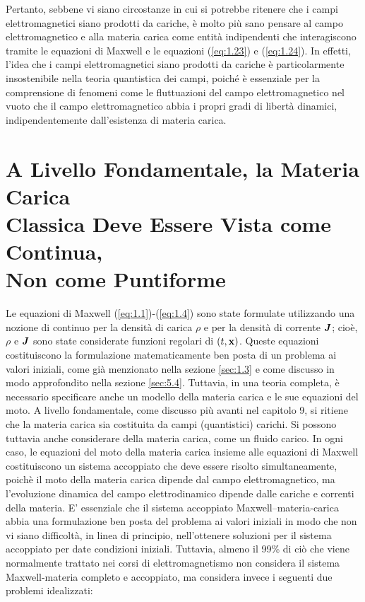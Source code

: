 Pertanto, sebbene vi siano circostanze in cui si potrebbe ritenere che i campi elettromagnetici siano prodotti da cariche, è molto più sano pensare al campo elettromagnetico e alla materia carica come entità indipendenti che interagiscono tramite le equazioni di Maxwell e le equazioni (\ref{eq:1.23}) e (\ref{eq:1.24}). In effetti, l'idea che i campi elettromagnetici siano prodotti da cariche è particolarmente insostenibile nella teoria quantistica dei campi, poiché è essenziale per la comprensione di fenomeni come le fluttuazioni del campo elettromagnetico nel vuoto che il campo elettromagnetico abbia i propri gradi di libertà dinamici, indipendentemente dall'esistenza di materia carica.

\section[Materia Carica come un Continuo]{A Livello Fondamentale, la Materia Carica \\Classica Deve Essere Vista come Continua, \\Non come Puntiforme}\label{sec:1.4}

Le equazioni di Maxwell (\ref{eq:1.1})-(\ref{eq:1.4}) sono state formulate utilizzando una nozione di continuo per la densità di carica $\rho$ e per la densità di corrente $\vb*{J}$; cioè, $\rho$ e  $\vb*{J}$ sono state considerate funzioni regolari di $(t, \vb{x})$. Queste equazioni costituiscono la formulazione matematicamente ben posta di un problema ai valori iniziali, come già menzionato nella sezione \ref{sec:1.3} e come discusso in modo approfondito nella sezione \ref{sec:5.4}. Tuttavia, in una teoria completa, è necessario specificare anche un modello della materia carica e le sue equazioni del moto. A livello fondamentale, come discusso più avanti nel capitolo 9, si ritiene che la materia carica sia costituita da campi (quantistici) carichi.  Si possono tuttavia anche considerare  della materia carica, come un fluido carico. In ogni caso, le equazioni del moto della materia carica insieme alle equazioni di Maxwell costituiscono un sistema accoppiato che deve essere risolto simultaneamente, poichè il moto della materia carica dipende dal campo elettromagnetico, ma l'evoluzione dinamica del campo elettrodinamico dipende dalle cariche e correnti della materia. E' essenziale che il sistema accoppiato Maxwell--materia-carica abbia una formulazione ben posta del problema ai valori iniziali in modo che non vi siano difficoltà, in linea di principio, nell'ottenere soluzioni per il sistema accoppiato per date condizioni iniziali. Tuttavia, almeno il 99\% di ciò che viene normalmente trattato nei corsi di elettromagnetismo non considera il sistema Maxwell-materia completo e accoppiato, ma considera invece i seguenti due problemi idealizzati:

